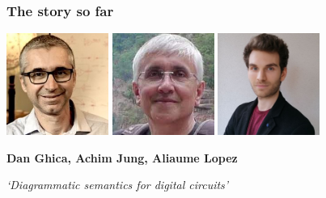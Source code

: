 \begin{frame}
    \frametitle{The story so far}

    \centering

    \includegraphics[width=0.25\textwidth]{imgs/ghica}
    \includegraphics[width=0.25\textwidth]{imgs/achim}
    \includegraphics[width=0.25\textwidth]{imgs/lopez}

    \LARGE
    \textbf{Dan Ghica, Achim Jung, Aliaume Lopez}

    \normalsize
    \emph{`Diagrammatic semantics for digital circuits'}


\end{frame}

